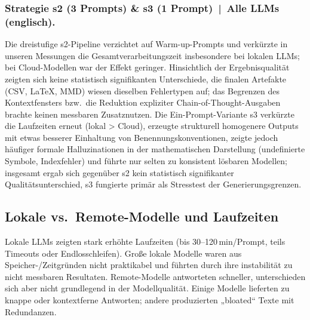 \documentclass[runningheads]{llncs}
\begin{document}
\subsubsection{Strategie s2 (3 Prompts) \& s3 (1 Prompt) \,|\, Alle LLMs (englisch).}
Die dreistufige s2-Pipeline verzichtet auf Warm-up-Prompts und verkürzte in unseren Messungen die Gesamtverarbeitungszeit insbesondere bei lokalen LLMs; bei Cloud-Modellen war der Effekt geringer. Hinsichtlich der Ergebnisqualität zeigten sich keine statistisch signifikanten Unterschiede, die finalen Artefakte (CSV, LaTeX, MMD) wiesen dieselben Fehlertypen auf; das Begrenzen des Kontextfensters bzw.\ die Reduktion expliziter Chain-of-Thought-Ausgaben brachte keinen messbaren Zusatznutzen. Die Ein-Prompt-Variante s3 verkürzte die Laufzeiten erneut (lokal > Cloud), erzeugte strukturell homogenere Outputs mit etwas besserer Einhaltung von Benennungskonventionen, zeigte jedoch häufiger formale Halluzinationen in der mathematischen Darstellung (undefinierte Symbole, Indexfehler) und führte nur selten zu konsistent lösbaren Modellen; insgesamt ergab sich gegenüber s2 kein statistisch signifikanter Qualitätsunterschied, s3 fungierte primär als Stresstest der Generierungsgrenzen.

\subsection{Lokale vs.\ Remote-Modelle und Laufzeiten}
Lokale LLMs zeigten stark erhöhte Laufzeiten (bis 30--120\,min/Prompt, teils Timeouts oder Endlosschleifen). Große lokale Modelle waren aus Speicher-/Zeitgründen nicht praktikabel und führten durch ihre instabilität zu nicht messbaren Resultaten. Remote-Modelle antworteten schneller, unterschieden sich aber nicht grundlegend in der Modellqualität. Einige Modelle lieferten zu knappe oder kontextferne Antworten; andere produzierten „bloated“ Texte mit Redundanzen.
\end{document}
